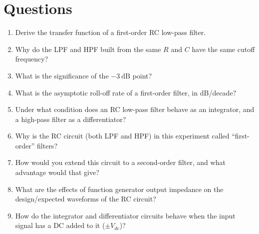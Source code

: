 \section{Questions}
\begin{enumerate}
	\item Derive the transfer function of a first-order RC low-pass filter.
	\item Why do the LPF and HPF built from the same $R$ and $C$ have the same
	cutoff frequency?
	\item What is the significance of the $-3\ \text{dB}$ point?
	\item What is the asymptotic roll-off rate of a first-order filter, in
	dB/decade?
	\item Under what condition does an RC low-pass filter behave as an
	integrator, and a high-pass filter as a differentiator?
	\item Why is the RC circuit (both LPF and HPF) in this experiment called  ``first-order'' filters?
	\item How would you extend this circuit to a second-order filter, and
	what advantage would that give?
	\item What are the effects of function generator output impedance on the design/expected waveforms of the RC circuit?
	\item How do the integrator and differentiator circuits behave when the input signal has a DC added to it ($\pm V_{dc}$)?
\end{enumerate}